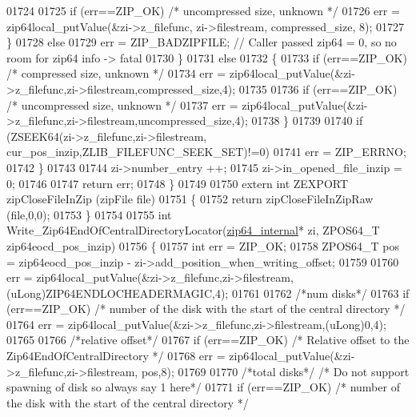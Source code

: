 \begin{DoxyCode}
01724 
01725             \textcolor{keywordflow}{if} (err==ZIP\_OK) \textcolor{comment}{/* uncompressed size, unknown */}
01726               err = zip64local\_putValue(&zi->z\_filefunc, zi->filestream, compressed\_size, 8);
01727           \}
01728           \textcolor{keywordflow}{else}
01729               err = ZIP\_BADZIPFILE; \textcolor{comment}{// Caller passed zip64 = 0, so no room for zip64 info -> fatal}
01730         \}
01731         \textcolor{keywordflow}{else}
01732         \{
01733           \textcolor{keywordflow}{if} (err==ZIP\_OK) \textcolor{comment}{/* compressed size, unknown */}
01734               err = zip64local\_putValue(&zi->z\_filefunc,zi->filestream,compressed\_size,4);
01735 
01736           \textcolor{keywordflow}{if} (err==ZIP\_OK) \textcolor{comment}{/* uncompressed size, unknown */}
01737               err = zip64local\_putValue(&zi->z\_filefunc,zi->filestream,uncompressed\_size,4);
01738         \}
01739 
01740         \textcolor{keywordflow}{if} (ZSEEK64(zi->z\_filefunc,zi->filestream, cur\_pos\_inzip,ZLIB\_FILEFUNC\_SEEK\_SET)!=0)
01741             err = ZIP\_ERRNO;
01742     \}
01743 
01744     zi->number\_entry ++;
01745     zi->in\_opened\_file\_inzip = 0;
01746 
01747     \textcolor{keywordflow}{return} err;
01748 \}
01749 
01750 \textcolor{keyword}{extern} \textcolor{keywordtype}{int} ZEXPORT zipCloseFileInZip (zipFile file)
01751 \{
01752     \textcolor{keywordflow}{return} zipCloseFileInZipRaw (file,0,0);
01753 \}
01754 
01755 \textcolor{keywordtype}{int} Write\_Zip64EndOfCentralDirectoryLocator(\hyperlink{structzip64__internal}{zip64\_internal}* zi, ZPOS64\_T zip64eocd\_pos\_inzip)
01756 \{
01757   \textcolor{keywordtype}{int} err = ZIP\_OK;
01758   ZPOS64\_T pos = zip64eocd\_pos\_inzip - zi->add\_position\_when\_writing\_offset;
01759 
01760   err = zip64local\_putValue(&zi->z\_filefunc,zi->filestream,(uLong)ZIP64ENDLOCHEADERMAGIC,4);
01761 
01762   \textcolor{comment}{/*num disks*/}
01763     \textcolor{keywordflow}{if} (err==ZIP\_OK) \textcolor{comment}{/* number of the disk with the start of the central directory */}
01764       err = zip64local\_putValue(&zi->z\_filefunc,zi->filestream,(uLong)0,4);
01765 
01766   \textcolor{comment}{/*relative offset*/}
01767     \textcolor{keywordflow}{if} (err==ZIP\_OK) \textcolor{comment}{/* Relative offset to the Zip64EndOfCentralDirectory */}
01768       err = zip64local\_putValue(&zi->z\_filefunc,zi->filestream, pos,8);
01769 
01770   \textcolor{comment}{/*total disks*/} \textcolor{comment}{/* Do not support spawning of disk so always say 1 here*/}
01771     \textcolor{keywordflow}{if} (err==ZIP\_OK) \textcolor{comment}{/* number of the disk with the start of the central directory */}

\end{DoxyCode}
